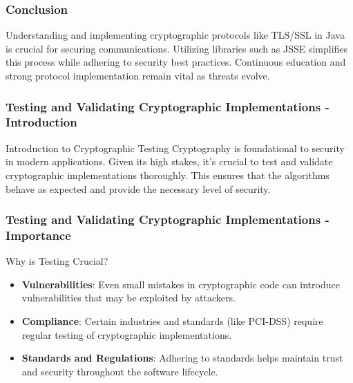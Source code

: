 \documentclass{beamer}
\begin{document}
\begin{frame}
    \frametitle{Conclusion}
    Understanding and implementing cryptographic protocols like TLS/SSL in Java is crucial for securing communications. Utilizing libraries such as JSSE simplifies this process while adhering to security best practices. Continuous education and strong protocol implementation remain vital as threats evolve.
\end{frame}

\begin{frame}[fragile]
    \frametitle{Testing and Validating Cryptographic Implementations - Introduction}
    \begin{block}{Introduction to Cryptographic Testing}
        Cryptography is foundational to security in modern applications. Given its high stakes, it’s crucial to test and validate cryptographic implementations thoroughly. This ensures that the algorithms behave as expected and provide the necessary level of security.
    \end{block}
\end{frame}

\begin{frame}[fragile]
    \frametitle{Testing and Validating Cryptographic Implementations - Importance}
    \begin{block}{Why is Testing Crucial?}
        \begin{itemize}
            \item \textbf{Vulnerabilities}: Even small mistakes in cryptographic code can introduce vulnerabilities that may be exploited by attackers.
            \item \textbf{Compliance}: Certain industries and standards (like PCI-DSS) require regular testing of cryptographic implementations.
            \item \textbf{Standards and Regulations}: Adhering to standards helps maintain trust and security throughout the software lifecycle.
        \end{itemize}
    \end{block}
\end{frame}
\end{document}
